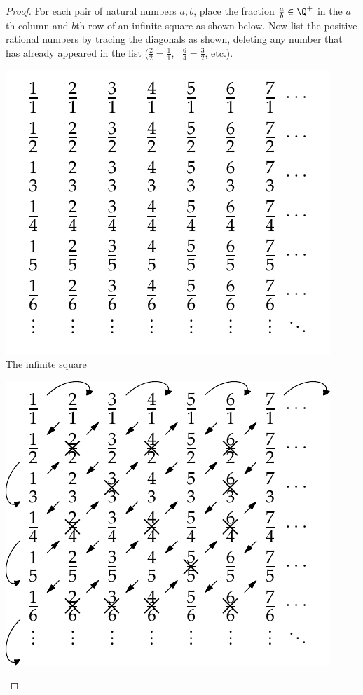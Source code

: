 \begin{proof}
	For each pair of natural numbers $a,b$, place the fraction $\frac ab\in\Q^+$ in the $a$th column and $b$th row of an infinite square as shown below. Now list the positive rational numbers by tracing the diagonals as shown, deleting any number that has already appeared in the list ($\frac 22=\frac 11$, \ $\frac 64=\frac 32$, etc.).
	\begin{center}
		\begin{minipage}{0.38\textwidth}\centering
			\includegraphics[width=\textwidth]{cardinality-01-qcount}\\
			The infinite square
		\end{minipage}\qquad\qquad\qquad
		\begin{minipage}{0.38\textwidth}\centering
			\includegraphics[width=\textwidth]{cardinality-02-qcount}\\

\end{minipage}
\end{center}
\end{proof}
